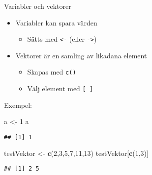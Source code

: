 \documentclass[
  10pt,
  ignorenonframetext,
]{beamer}
\newenvironment{Shaded}{\begin{snugshade}}{\end{snugshade}}
\newcommand{\DecValTok}[1]{\textcolor[rgb]{0.00,0.00,0.81}{#1}}
\newcommand{\FunctionTok}[1]{\textcolor[rgb]{0.13,0.29,0.53}{\textbf{#1}}}
\newcommand{\NormalTok}[1]{#1}
\newcommand{\OtherTok}[1]{\textcolor[rgb]{0.56,0.35,0.01}{#1}}
\providecommand{\tightlist}{%
  \setlength{\itemsep}{0pt}\setlength{\parskip}{0pt}}
\begin{document}
\begin{frame}[fragile]{Variabler och vektorer}
\protect\hypertarget{variabler-och-vektorer}{}
\begin{itemize}
\tightlist
\item
  Variabler kan spara värden

  \begin{itemize}
  \tightlist
  \item
    Sätts med \texttt{<-} (eller \texttt{->})
  \end{itemize}
\item
  Vektorer är en samling av likadana element

  \begin{itemize}
  \tightlist
  \item
    Skapas med \texttt{c()}
  \item
    Välj element med \texttt{[ ]}
  \end{itemize}
\end{itemize}

Exempel:

\begin{Shaded}
\begin{Highlighting}[]
\NormalTok{a }\OtherTok{\textless{}{-}} \DecValTok{1}
\NormalTok{a}
\end{Highlighting}
\end{Shaded}

\begin{verbatim}
## [1] 1
\end{verbatim}

\begin{Shaded}
\begin{Highlighting}[]
\NormalTok{testVektor }\OtherTok{\textless{}{-}} \FunctionTok{c}\NormalTok{(}\DecValTok{2}\NormalTok{,}\DecValTok{3}\NormalTok{,}\DecValTok{5}\NormalTok{,}\DecValTok{7}\NormalTok{,}\DecValTok{11}\NormalTok{,}\DecValTok{13}\NormalTok{)}
\NormalTok{testVektor[}\FunctionTok{c}\NormalTok{(}\DecValTok{1}\NormalTok{,}\DecValTok{3}\NormalTok{)]}
\end{Highlighting}
\end{Shaded}

\begin{verbatim}
## [1] 2 5
\end{verbatim}
\end{frame}
\end{document}
